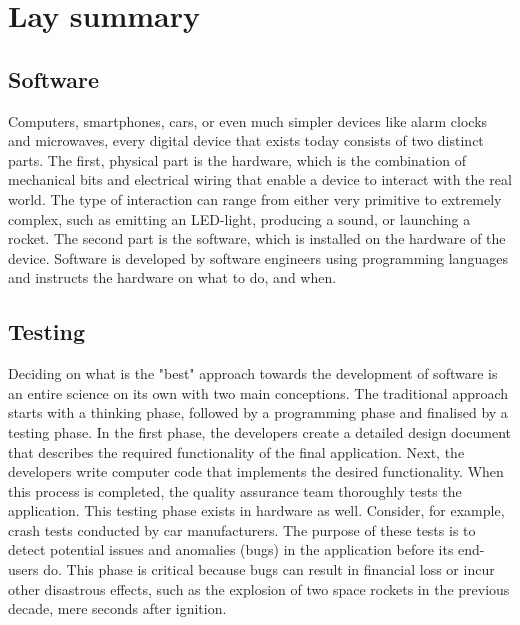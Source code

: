 
\chapter{Lay summary}

\section*{Software}
Computers, smartphones, cars, or even much simpler devices like alarm clocks and microwaves, every digital device that exists today consists of two distinct parts. The first, physical part is the hardware, which is the combination of mechanical bits and electrical wiring that enable a device to interact with the real world. The type of interaction can range from either very primitive to extremely complex, such as emitting an LED-light, producing a sound, or launching a rocket. The second part is the software, which is installed on the hardware of the device. Software is developed by software engineers using programming languages and instructs the hardware on what to do, and when.

\section*{Testing}
Deciding on what is the "best" approach towards the development of software is an entire science on its own with two main conceptions. The traditional approach starts with a thinking phase, followed by a programming phase and finalised by a testing phase. In the first phase, the developers create a detailed design document that describes the required functionality of the final application. Next, the developers write computer code that implements the desired functionality. When this process is completed, the quality assurance team thoroughly tests the application. This testing phase exists in hardware as well. Consider, for example, crash tests conducted by car manufacturers. The purpose of these tests is to detect potential issues and anomalies (bugs) in the application before its end-users do. This phase is critical because bugs can result in financial loss or incur other disastrous effects, such as the explosion of two space rockets in the previous decade, mere seconds after ignition.

